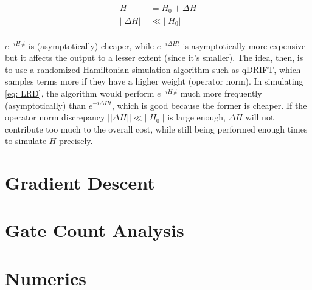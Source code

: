 \begin{equation}
    \begin{split}
        H &= H_0 + \Delta H \\
        ||\Delta H|| &\ll ||H_0|| \\
    \end{split}
    \label{eq: LRD}
\end{equation}

$e^{-iH_0t}$ is (asymptotically) cheaper, while $e^{-i\Delta Ht}$ is asymptotically more expensive but it affects the output to a lesser extent (since it's smaller). The idea, then, is to use a randomized Hamiltonian simulation algorithm such as qDRIFT, which samples terms more if they have a higher weight (operator norm). In simulating \eqref{eq: LRD}, the algorithm would perform $e^{-iH_0t}$ much more frequently (asymptotically) than $e^{-i\Delta Ht}$, which is good because the former is cheaper. If the operator norm discrepancy $||\Delta H|| \ll ||H_0||$ is large enough, $\Delta H$ will not contribute too much to the overall cost, while still being performed enough times to simulate $H$ precisely.


\section{Gradient Descent}
\section{Gate Count Analysis}
\section{Numerics}



